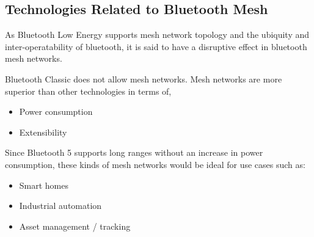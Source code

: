 \documentclass[journal, a4paper]{IEEEtran}
\begin{document}
\subsection{Technologies Related to Bluetooth Mesh}

As Bluetooth Low Energy supports mesh network topology and the ubiquity and inter-operatability of bluetooth, it is said to have a disruptive effect in bluetooth mesh networks. 

Bluetooth Classic does not allow mesh networks. Mesh networks are more superior than other technologies in terms of,

\begin{itemize}
\item Power consumption
\item Extensibility
\end{itemize}

Since Bluetooth 5 supports long ranges without an increase in power consumption, these kinds of mesh networks would be ideal for use cases such as:

\begin{itemize}
\item Smart homes
\item Industrial automation
\item Asset management / tracking
\end{itemize}
\end{document}
